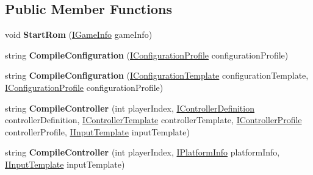 \subsection*{Public Member Functions}
\begin{DoxyCompactItemize}
\item 
\hypertarget{interface_snowflake_1_1_emulator_1_1_i_emulator_bridge_a8245f048054db9e2b45f07bebaea3c02}{}void {\bfseries Start\+Rom} (\hyperlink{interface_snowflake_1_1_game_1_1_i_game_info}{I\+Game\+Info} game\+Info)\label{interface_snowflake_1_1_emulator_1_1_i_emulator_bridge_a8245f048054db9e2b45f07bebaea3c02}

\item 
\hypertarget{interface_snowflake_1_1_emulator_1_1_i_emulator_bridge_ad66a4b4654ef5856ee6393145b36f666}{}string {\bfseries Compile\+Configuration} (\hyperlink{interface_snowflake_1_1_emulator_1_1_configuration_1_1_i_configuration_profile}{I\+Configuration\+Profile} configuration\+Profile)\label{interface_snowflake_1_1_emulator_1_1_i_emulator_bridge_ad66a4b4654ef5856ee6393145b36f666}

\item 
\hypertarget{interface_snowflake_1_1_emulator_1_1_i_emulator_bridge_a55429243533cb5c9eb3ba204b73b4113}{}string {\bfseries Compile\+Configuration} (\hyperlink{interface_snowflake_1_1_emulator_1_1_configuration_1_1_i_configuration_template}{I\+Configuration\+Template} configuration\+Template, \hyperlink{interface_snowflake_1_1_emulator_1_1_configuration_1_1_i_configuration_profile}{I\+Configuration\+Profile} configuration\+Profile)\label{interface_snowflake_1_1_emulator_1_1_i_emulator_bridge_a55429243533cb5c9eb3ba204b73b4113}

\item 
\hypertarget{interface_snowflake_1_1_emulator_1_1_i_emulator_bridge_add8bb90ed261a06469c3bafbeeb4d7ab}{}string {\bfseries Compile\+Controller} (int player\+Index, \hyperlink{interface_snowflake_1_1_controller_1_1_i_controller_definition}{I\+Controller\+Definition} controller\+Definition, \hyperlink{interface_snowflake_1_1_emulator_1_1_input_1_1_i_controller_template}{I\+Controller\+Template} controller\+Template, \hyperlink{interface_snowflake_1_1_controller_1_1_i_controller_profile}{I\+Controller\+Profile} controller\+Profile, \hyperlink{interface_snowflake_1_1_emulator_1_1_input_1_1_i_input_template}{I\+Input\+Template} input\+Template)\label{interface_snowflake_1_1_emulator_1_1_i_emulator_bridge_add8bb90ed261a06469c3bafbeeb4d7ab}

\item 
\hypertarget{interface_snowflake_1_1_emulator_1_1_i_emulator_bridge_afddc96f9e6aab97573ea4eafb6498dad}{}string {\bfseries Compile\+Controller} (int player\+Index, \hyperlink{interface_snowflake_1_1_platform_1_1_i_platform_info}{I\+Platform\+Info} platform\+Info, \hyperlink{interface_snowflake_1_1_emulator_1_1_input_1_1_i_input_template}{I\+Input\+Template} input\+Template)\label{interface_snowflake_1_1_emulator_1_1_i_emulator_bridge_afddc96f9e6aab97573ea4eafb6498dad}


\end{DoxyCompactItemize}
